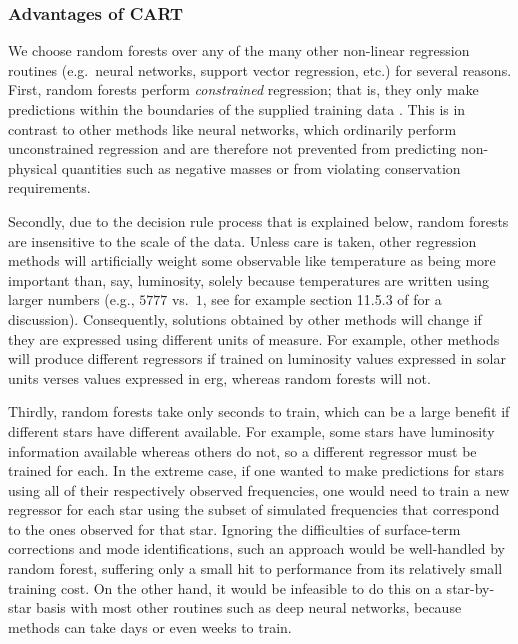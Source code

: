 \subsubsection*{Advantages of CART}
We choose random forests over any of the many other non-linear regression routines (e.g.\ neural networks, support vector regression, etc.) for several reasons. 
First, random forests perform \emph{constrained} regression; that is, they only make predictions within the boundaries of the supplied training data \citep[see e.g.][Section~9.2.1]{hastie2005elements}. This is in contrast to other methods like neural networks, which ordinarily perform unconstrained regression and are therefore not prevented from predicting non-physical quantities such as negative masses or from violating conservation requirements. 

Secondly, due to the decision rule process that is explained below, random forests are insensitive to the scale of the data. Unless care is taken, other regression methods will artificially weight some observable  like temperature as being more important than, say, luminosity, solely because temperatures are written using larger numbers (e.g., $5777$ vs.\ $1$, see for example section 11.5.3 of \citealt{hastie2005elements} for a discussion). 
Consequently, solutions obtained by other methods will change if they are  expressed using different units of measure. 
For example, other methods will produce different regressors if trained on luminosity values expressed in solar units verses values expressed in erg, whereas random forests will not.  

Thirdly, random forests take only seconds to train, which can be a large benefit if different stars have different  available. For example, some stars have luminosity information available whereas others do not, so a different regressor must be trained for each. In the extreme case, if one wanted to make predictions for stars using all of their respectively observed frequencies, one would need to train a new regressor for each star using the subset of simulated frequencies that correspond to the ones observed for that star. Ignoring the difficulties of surface-term corrections and mode identifications, such an approach would be well-handled by random forest, suffering only a small hit to performance from its relatively small training cost. On the other hand, it would be infeasible to do this on a star-by-star basis with most other routines such as deep neural networks, because  methods can take days or even weeks to train. 


